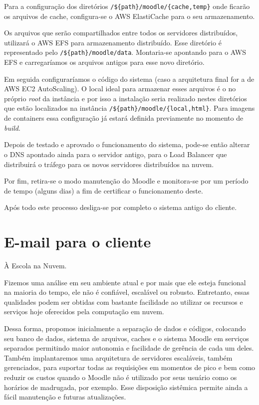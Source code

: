 \documentclass{article}
\begin{document}
Para a configuração dos diretórios \texttt{/\$\{path\}/moodle/\{cache,temp\}} onde ficarão os arquivos de cache, configura-se o AWS ElastiCache para o seu armazenamento.

Os arquivos que serão compartilhados entre todos os servidores distribuídos, utilizará o AWS EFS para armazenamento distribuído.
Esse diretório é representado pelo \texttt{/\$\{path\}/moodle/data}. 
Montaria-se apontando para o AWS EFS e carregaríamos os arquivos antigos para esse novo diretório.

Em seguida configuraríamos o código do sistema (caso a arquitetura final for a de AWS EC2 AutoScaling).
O local ideal para armazenar esses arquivos é o no próprio \textit{root} da instância e por isso a instalação seria realizado nestes diretórios que estão localizados na instância \texttt{/\$\{path\}/moodle/\{local,html\}}.
Para imagens de containers essa configuração já estará definida previamente no momento de \textit{build}.



Depois de testado e aprovado o funcionamento do sistema, pode-se então alterar o DNS apontado ainda para o servidor antigo, para o Load Balancer que distribuirá o tráfego para os novos servidores distribuídos na nuvem.

Por fim, retira-se o modo manutenção do Moodle e monitora-se por um período de tempo (alguns dias) a fim de certificar o funcionamento deste.

Após todo este processo desliga-se por completo o sistema antigo do cliente.


\section{E-mail para o cliente}
À Escola na Nuvem.

Fizemos uma análise em seu ambiente atual e por mais que ele esteja funcional na maioria do tempo, ele não é confiável, escalável ou robusto.
Entretanto, essas qualidades podem ser obtidas com bastante facilidade ao utilizar os recursos e serviços hoje oferecidos pela computação em nuvem.

Dessa forma, propomos inicialmente a separação de dados e códigos, colocando seu banco de dados, sistema de arquivos, caches e o sistema Moodle em serviços separados permitindo maior autonomia e facilidade de gerência de cada um deles. 
Também implantaremos uma arquitetura de servidores escaláveis, também gerenciados, para suportar todas as requisições em momentos de pico e bem como reduzir os custos quando o Moodle não é utilizado por seus usuário como os horários de madrugada, por exemplo. 
Esse disposição sistêmica permite ainda a fácil manutenção e futuras atualizações.
\end{document}
